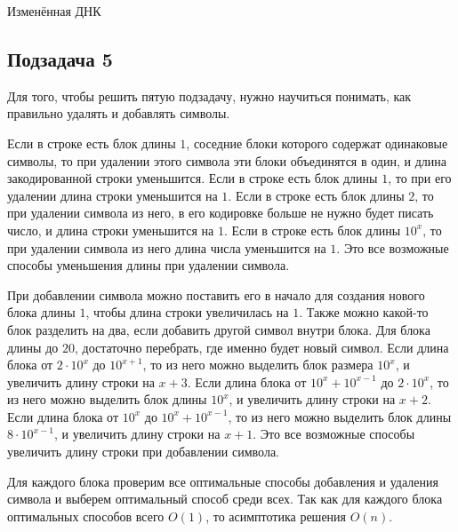 \begin{tutorial}{Изменённая ДНК}
\subsection*{Подзадача 5}
Для того, чтобы решить пятую подзадачу, нужно научиться понимать, как правильно удалять и добавлять символы. 

Если в строке есть блок длины $1$, соседние блоки которого содержат одинаковые символы, то при удалении этого символа эти блоки объединятся в один, и длина закодированной строки уменьшится. Если в строке есть блок длины $1$, то при его удалении длина строки уменьшится на $1$. Если в строке есть блок длины $2$, то при удалении символа из него, в его кодировке больше не нужно будет писать число, и длина строки уменьшится на $1$. Если в строке есть блок длины ${10}^x$, то при удалении символа из него длина числа уменьшится на $1$. Это все возможные способы уменьшения длины при удалении символа. 

При добавлении символа можно поставить его в начало для создания нового блока длины $1$, чтобы длина строки увеличилась на $1$. Также можно какой-то блок разделить на два, если добавить другой символ внутри блока. Для блока длины до $20$, достаточно перебрать, где именно будет новый символ. Если длина блока от $2 \cdot {10}^x$ до ${10}^{x + 1}$, то из него можно выделить блок размера ${10}^x$, и увеличить длину строки на $x + 3$. Если длина блока от ${10}^x + {10}^{x - 1}$ до $2 \cdot {10}^x$, то из него можно выделить блок длины ${10}^x$, и увеличить длину строки на $x + 2$. Если длина блока от ${10}^x$ до ${10}^x + {10}^{x - 1}$, то из него можно выделить блок длины $8 \cdot {10}^{x - 1}$, и увеличить длину строки на $x + 1$. Это все возможные способы увеличить длину строки при добавлении символа.

Для каждого блока проверим все оптимальные способы добавления и удаления символа и выберем оптимальный способ среди всех. Так как для каждого блока оптимальных способов всего $O(1)$, то асимптотика решения $O(n)$.


\end{tutorial}
